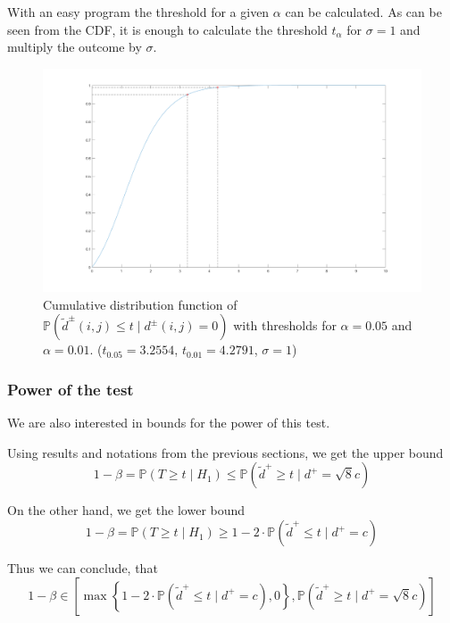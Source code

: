 \documentclass{beamer}
\begin{document}
\begin{frame}
	With an easy program the threshold for a given $\alpha$ can be calculated. As can be seen from the CDF, it is enough to calculate the threshold $t_\alpha$ for $\sigma = 1$ and multiply the outcome by $\sigma$.
	\begin{figure}
		\includegraphics[width=0.6\linewidth]{Testing/CDF}
		\caption[CDF]{Cumulative distribution function of $\mathbb{P}(\tilde{d}^\pm(i, j) \leq t \mid d^\pm(i, j) = 0)$ with thresholds for $\alpha = 0.05$ and $\alpha = 0.01$. ($t_{0.05} = 3.2554$, $t_{0.01} = 4.2791$, $\sigma = 1$)}
		\label{fig:CDF}
	\end{figure}
\end{frame}

\subsubsection{Power of the test}

\begin{frame}
	We are also interested in bounds for the power of this test.
	
	Using results and notations from the previous sections, we get the upper bound
	\begin{equation*}
		1 - \beta = \mathbb{P}(T \geq t \mid H_1) \leq \mathbb{P}(\tilde{d}^+ \geq t \mid d^+ = \sqrt{8} c)
	\end{equation*}
	
	On the other hand, we get the lower bound
	\begin{equation*}
		1 - \beta = \mathbb{P}(T \geq t \mid H_1) \geq 1 - 2 \cdot \mathbb{P}(\tilde{d}^+ \leq t \mid d^+ = c)
	\end{equation*}
	
	Thus we can conclude, that
	\begin{equation*}
		1 - \beta \in \left[ \max \left\{ 1 - 2 \cdot \mathbb{P}(\tilde{d}^+ \leq t \mid d^+ = c), 0 \right\}, \mathbb{P}(\tilde{d}^+ \geq t \mid d^+ = \sqrt{8} c) \right]
	\end{equation*}
\end{frame}
\end{document}
